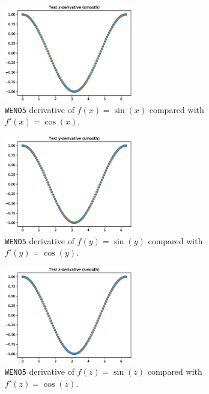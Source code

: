 \documentclass[11pt]{article}
\begin{document}
\begin{figure}[htbp]
\centering
\includegraphics[width=0.5\textwidth]{./weno-smoothx.eps}
\caption{\label{fig:orgc21fdc6}
\texttt{WENO5} derivative of \(f\left(x\right)=\sin\left(x\right)\) compared with \(f'\left(x\right)=\cos\left(x\right)\).}
\end{figure}

\begin{figure}[htbp]
\centering
\includegraphics[width=0.5\textwidth]{./weno-smoothy.eps}
\caption{\label{fig:org4c112b5}
\texttt{WENO5} derivative of \(f\left(y\right)=\sin\left(y\right)\) compared with \(f'\left(y\right)=\cos\left(y\right)\).}
\end{figure}

\begin{figure}[htbp]
\centering
\includegraphics[width=0.5\textwidth]{./weno-smoothz.eps}
\caption{\label{fig:org7947a10}
\texttt{WENO5} derivative of \(f\left(z\right)=\sin\left(z\right)\) compared with \(f'\left(z\right)=\cos\left(z\right)\).}
\end{figure}
\end{document}
